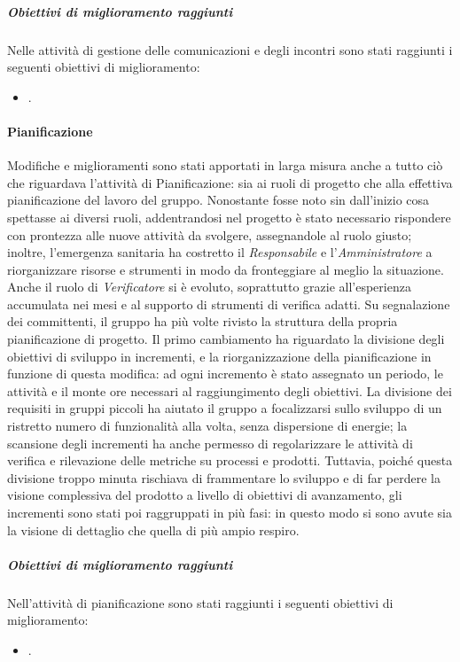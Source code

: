				\subparagraph{Obiettivi di miglioramento raggiunti}
					Nelle attività di gestione delle comunicazioni e degli incontri sono stati raggiunti i seguenti obiettivi di miglioramento:
					\begin{itemize}
						\item .
					\end{itemize}
		
			\paragraph{Pianificazione}
				Modifiche e miglioramenti sono stati apportati in larga misura anche a tutto ciò che riguardava l'attività di Pianificazione: sia ai ruoli di progetto che alla effettiva pianificazione del lavoro del gruppo.
				\newline
				Nonostante fosse noto sin dall'inizio cosa spettasse ai diversi ruoli, addentrandosi nel progetto è stato necessario rispondere con prontezza alle nuove attività da svolgere, assegnandole al ruolo giusto; inoltre, l'emergenza sanitaria ha costretto il \textit{Responsabile} e l'\textit{Amministratore} a riorganizzare risorse e strumenti in modo da fronteggiare al meglio la situazione. Anche il ruolo di \textit{Verificatore} si è evoluto, soprattutto grazie all'esperienza accumulata nei mesi e al supporto di strumenti di verifica adatti.
				\newline
				Su segnalazione dei committenti, il gruppo ha più volte rivisto la struttura della propria pianificazione di progetto. Il primo cambiamento ha riguardato la divisione degli obiettivi di sviluppo in incrementi, e la riorganizzazione della pianificazione in funzione di questa modifica: ad ogni incremento è stato assegnato un periodo, le attività e il monte ore necessari al raggiungimento degli obiettivi. La divisione dei requisiti in gruppi piccoli ha aiutato il gruppo a focalizzarsi sullo sviluppo di un ristretto numero di funzionalità alla volta, senza dispersione di energie; la scansione degli incrementi ha anche permesso di regolarizzare le attività di verifica e rilevazione delle metriche su processi e prodotti. Tuttavia, poiché questa divisione troppo minuta rischiava di frammentare lo sviluppo e di far perdere la visione complessiva del prodotto a livello di obiettivi di avanzamento, gli incrementi sono stati poi raggruppati in più fasi: in questo modo si sono avute sia la visione di dettaglio che quella di più ampio respiro.
				
				\subparagraph{Obiettivi di miglioramento raggiunti}
					Nell'attività di pianificazione sono stati raggiunti i seguenti obiettivi di miglioramento:
					\begin{itemize}
						\item .
					\end{itemize}
		
